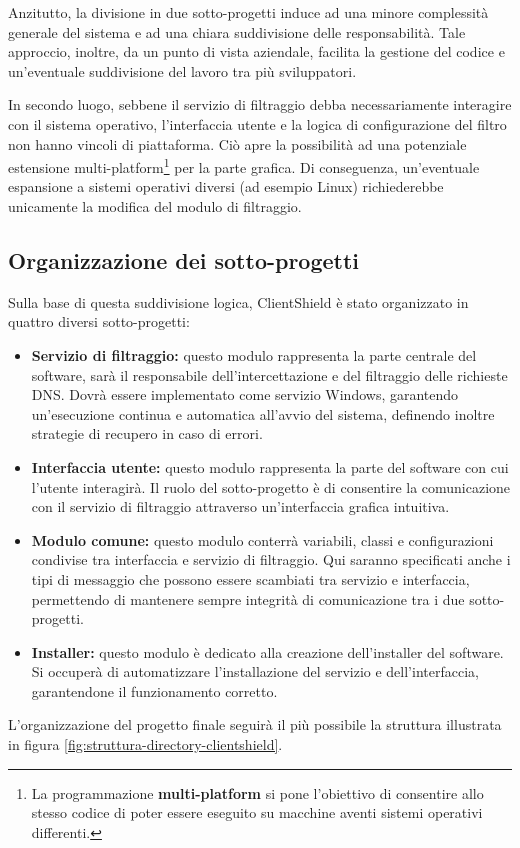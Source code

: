 \documentclass[12pt,a4paper,openright,twoside]{book}
\begin{document}
Anzitutto, la divisione in due sotto-progetti induce ad una minore complessità generale del sistema e ad una chiara suddivisione delle responsabilità.
Tale approccio, inoltre, da un punto di vista aziendale, facilita la gestione del codice e un'eventuale suddivisione del lavoro tra più sviluppatori.

In secondo luogo, sebbene il servizio di filtraggio debba necessariamente interagire con il sistema operativo, l'interfaccia utente e la logica di configurazione del filtro non hanno vincoli di piattaforma.
Ciò apre la possibilità ad una potenziale estensione multi-platform\footnote{La programmazione \textbf{multi-platform} si pone l'obiettivo di consentire allo stesso codice di poter essere eseguito su macchine aventi sistemi operativi differenti.} per la parte grafica.
Di conseguenza, un'eventuale espansione a sistemi operativi diversi (ad esempio Linux) richiederebbe unicamente la modifica del modulo di filtraggio.

\subsection{Organizzazione dei sotto-progetti}
\label{ssec:organizzazione-sotto-progetti}

Sulla base di questa suddivisione logica, ClientShield è stato organizzato in quattro diversi sotto-progetti:

\begin{itemize}
	\item \textbf{Servizio di filtraggio:}
	questo modulo rappresenta la parte centrale del software, sarà il responsabile dell'intercettazione e del filtraggio delle richieste \gls{DNS}.
	Dovrà essere implementato come servizio Windows, garantendo un'esecuzione continua e automatica all'avvio del sistema, definendo inoltre strategie di recupero in caso di errori.
	
	\item \textbf{Interfaccia utente:}
	questo modulo rappresenta la parte del software con cui l'utente interagirà.
	Il ruolo del sotto-progetto è di consentire la comunicazione con il servizio di filtraggio attraverso un'interfaccia grafica intuitiva.
	
	\item \textbf{Modulo comune:}
	questo modulo conterrà variabili, classi e configurazioni condivise tra interfaccia e servizio di filtraggio.
	Qui saranno specificati anche i tipi di messaggio che possono essere scambiati tra servizio e interfaccia, permettendo di mantenere sempre integrità di comunicazione tra i due sotto-progetti.
	
	\item \textbf{Installer:}
	questo modulo è dedicato alla creazione dell'installer del software.
	Si occuperà di automatizzare l'installazione del servizio e dell'interfaccia, garantendone il funzionamento corretto.
\end{itemize}
L'organizzazione del progetto finale seguirà il più possibile la struttura illustrata in figura \ref{fig:struttura-directory-clientshield}.
\end{document}
